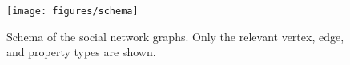 \begin{figure}[htb]
    \centering
    \texttt{[image: figures/schema]}
    \caption{Schema of the social network graphs. Only the relevant vertex, edge, and property types are shown.}
    \label{fig:schema}
\end{figure}
